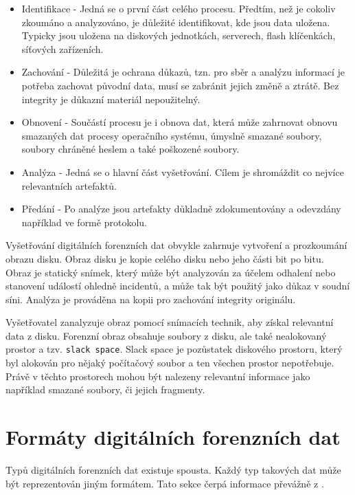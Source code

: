\begin{itemize}
\item Identifikace - Jedná se o první část celého procesu. Předtím, než je cokoliv zkoumáno a analyzováno, je důležité identifikovat, kde jsou data uložena. Typicky jsou uložena na diskových jednotkách, serverech, flash klíčenkách, síťových zařízeních.

\item Zachování - Důležitá je ochrana důkazů, tzn. pro sběr a analýzu informací je potřeba zachovat původní data, musí se zabránit jejich změně a ztrátě. Bez integrity je důkazní materiál nepoužitelný.

\item Obnovení - Součástí procesu je i obnova dat, která může zahrnovat obnovu smazaných dat procesy operačního systému, úmyslně smazané soubory, soubory chráněné heslem a také poškozené soubory.

\item Analýza - Jedná se o hlavní část vyšetřování. Cílem je shromáždit co nejvíce relevantních artefaktů.

\item Předání - Po analýze jsou artefakty důkladně zdokumentovány a odevzdány například ve formě protokolu.
\end{itemize}

\noindent Vyšetřování digitálních forenzních dat obvykle zahrnuje vytvoření a prozkoumání obrazu disku. Obraz disku je kopie celého disku nebo jeho části bit po bitu. Obraz je statický snímek, který může být analyzován za účelem odhalení nebo stanovení událostí ohledně incidentů, a může tak být použitý jako důkaz v soudní síni. Analýza je prováděna na kopii pro zachování integrity originálu.

Vyšetřovatel zanalyzuje obraz pomocí snímacích technik, aby získal relevantní data z disku. Forenzní obraz obsahuje soubory z disku, ale také nealokovaný prostor a tzv. \texttt{slack space}. Slack space je pozůstatek diskového prostoru, který byl alokován pro nějaký počítačový soubor a ten všechen prostor nepotřebuje. Právě v těchto prostorech mohou být nalezeny relevantní informace jako například smazané soubory, či jejich fragmenty. \cite{forensicImages}

\section{Formáty digitálních forenzních dat}
Typů digitálních forenzních dat existuje spousta. Každý typ takových dat může být reprezentován jiným formátem. Tato sekce čerpá informace převážně z \cite{forensicswikiForensicFF}.

